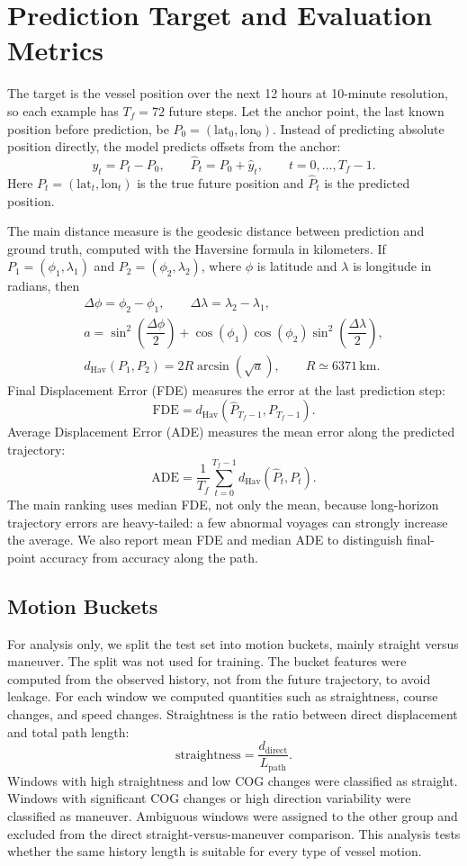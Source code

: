 \section{Prediction Target and Evaluation Metrics}
The target is the vessel position over the next 12 hours at 10-minute resolution, so each example has $T_f=72$ future steps. Let the anchor point, the last known position before prediction, be $P_0=(\mathrm{lat}_0,\mathrm{lon}_0)$. Instead of predicting absolute position directly, the model predicts offsets from the anchor:
\[
 y_t=P_t-P_0,\qquad \hat{P}_t=P_0+\hat{y}_t,\qquad t=0,\ldots,T_f-1.
\]
Here $P_t=(\mathrm{lat}_t,\mathrm{lon}_t)$ is the true future position and $\hat{P}_t$ is the predicted position.

The main distance measure is the geodesic distance between prediction and ground truth, computed with the Haversine formula in kilometers. If $P_1=(\phi_1,\lambda_1)$ and $P_2=(\phi_2,\lambda_2)$, where $\phi$ is latitude and $\lambda$ is longitude in radians, then
\[
\begin{array}{c}
\Delta\phi=\phi_2-\phi_1,\qquad \Delta\lambda=\lambda_2-\lambda_1,\\[1.2mm]
a=\sin^2\!\left(\dfrac{\Delta\phi}{2}\right)+\cos(\phi_1)\cos(\phi_2)\sin^2\!\left(\dfrac{\Delta\lambda}{2}\right),\\[1.2mm]
d_{\mathrm{Hav}}(P_1,P_2)=2R\arcsin\!\left(\sqrt{a}\right),\qquad R\simeq6371\,\mathrm{km}.
\end{array}
\]
Final Displacement Error (FDE) measures the error at the last prediction step:
\[
\mathrm{FDE}=d_{\mathrm{Hav}}\!\left(\hat{P}_{T_f-1},P_{T_f-1}\right).
\]
Average Displacement Error (ADE) measures the mean error along the predicted trajectory:
\[
\mathrm{ADE}=\frac{1}{T_f}\sum_{t=0}^{T_f-1}d_{\mathrm{Hav}}\!\left(\hat{P}_{t},P_t\right).
\]
The main ranking uses median FDE, not only the mean, because long-horizon trajectory errors are heavy-tailed: a few abnormal voyages can strongly increase the average. We also report mean FDE and median ADE to distinguish final-point accuracy from accuracy along the path.

\subsection{Motion Buckets}
For analysis only, we split the test set into motion buckets, mainly straight versus maneuver. The split was not used for training. The bucket features were computed from the observed history, not from the future trajectory, to avoid leakage. For each window we computed quantities such as straightness, course changes, and speed changes. Straightness is the ratio between direct displacement and total path length:
\[
\mathrm{straightness}=\frac{d_{\mathrm{direct}}}{L_{\mathrm{path}}}.
\]
Windows with high straightness and low COG changes were classified as straight. Windows with significant COG changes or high direction variability were classified as maneuver. Ambiguous windows were assigned to the other group and excluded from the direct straight-versus-maneuver comparison. This analysis tests whether the same history length is suitable for every type of vessel motion.

